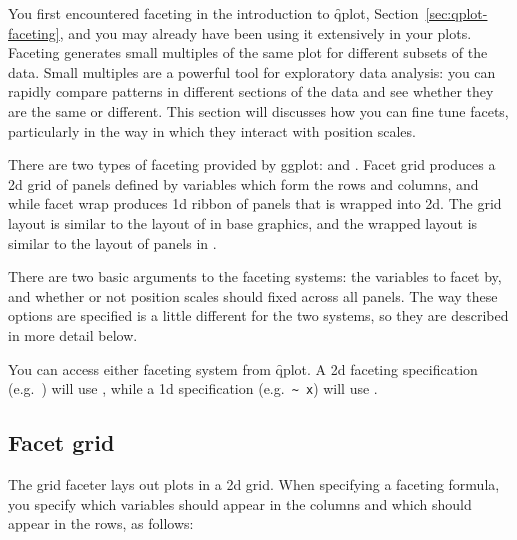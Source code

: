 You first encountered faceting in the introduction to \f{qplot}, Section~\ref{sec:qplot-faceting}, and you may already have been using it extensively in your plots.  Faceting generates small multiples of the same plot for different subsets of the data.  Small multiples are a powerful tool for exploratory data analysis: you can rapidly compare patterns in different sections of the data and see whether they are the same or different.  This section will discusses how you can fine tune facets, particularly in the way in which they interact with position scales. 

There are two types of faceting provided by ggplot:  and .  Facet grid produces a 2d grid of panels defined by variables which form the rows and columns, and while facet wrap produces 1d ribbon of panels that is wrapped into 2d.  The grid layout is similar to the layout of  in base graphics, and the wrapped layout is similar to the layout of panels in .

There are two basic arguments to the faceting systems: the variables to facet by, and whether or not position scales should fixed across all panels.  The way these options are specified is a little different for the two systems, so they are described in more detail below.


You can access either faceting system from \f{qplot}. A 2d faceting specification (e.g.\ ) will use , while a 1d specification (e.g.\ \verb|~ x|) will use .

\subsection{Facet grid}

The grid faceter lays out plots in a 2d grid.  When specifying a faceting formula, you specify which variables should appear in the columns and which should appear in the rows, as follows:  

